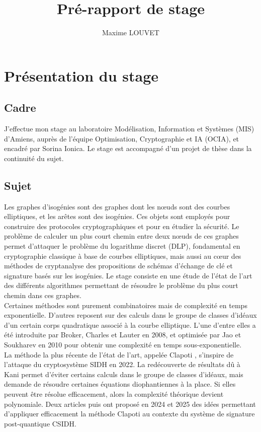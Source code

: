 \documentclass{article}
\title{Pré-rapport de stage}
\author{Maxime LOUVET}
\theoremstyle{definition}
\theoremstyle{remark}
\begin{document}
	\maketitle
	
	\section{Présentation du stage}
	
	\subsection{Cadre}
	
	J'effectue mon stage au laboratoire Modélisation, Information et Systèmes (MIS) d'Amiens, auprès de l'équipe Optimisation, Cryptographie et IA (OCIA), et encadré par Sorina Ionica. Le stage est accompagné d'un projet de thèse dans la continuité du sujet. 
	
	\subsection{Sujet}
	
	Les graphes d’isogénies sont des graphes dont les nœuds sont des courbes elliptiques, et les arêtes sont des isogénies. Ces objets sont employés pour construire des protocoles cryptographiques et pour en étudier la sécurité. Le problème de calculer un plus court chemin entre deux nœuds de ces graphes permet d’attaquer le problème du logarithme discret (DLP), fondamental en cryptographie classique à base de courbes elliptiques, mais aussi au cœur des méthodes de cryptanalyse des propositions de schémas d’échange de clé et signature basés sur les isogénies. Le stage consiste en une étude de l’état de l’art des différents algorithmes permettant de résoudre le problème du plus court chemin dans ces graphes.\\
	
	Certaines méthodes sont purement combinatoires mais de complexité en temps exponentielle. D'autres reposent sur des calculs dans le groupe de classes d’idéaux d’un certain corps quadratique associé à la courbe elliptique. L'une d'entre elles a été introduite par Broker, Charles et Lauter \cite{BrokerCharlesLauter} en 2008, et optimisée par Jao et Soukharev \cite{JaoSoukharev} en 2010 pour obtenir une complexité en temps sous-exponentielle.\\
	 
	La méthode la plus récente de l'état de l'art, appelée Clapoti \cite{Clapoti}, s'inspire de l'attaque du cryptosystème SIDH en 2022. La redécouverte de résultats dû à Kani permet d'éviter certains calculs dans le groupe de classes d'idéaux, mais demande de résoudre certaines équations diophantiennes à la place. Si elles peuvent être résolue efficacement, alors la complexité théorique devient polynomiale. Deux articles \cite{KLaPoTi} puis \cite{Pegasis} ont proposé en 2024 et 2025 des idées permettant d'appliquer efficacement la méthode Clapoti au contexte du système de signature post-quantique CSIDH. 
	
\end{document}
